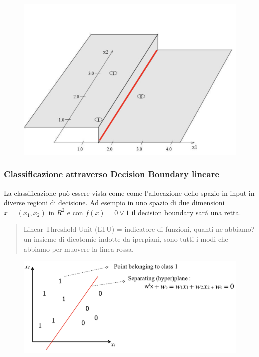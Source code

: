 \documentclass{article}
\begin{document}
\begin{figure}[H]
\centering
\includegraphics[scale=0.5]{Images/classificationplane.png}
\end{figure}

\subsubsection{Classificazione attraverso Decision Boundary lineare}
La classificazione può essere vista come come l'allocazione dello spazio in input in diverse regioni di decisione. Ad esempio in uno spazio di due dimensioni $x=(x_1,x_2)$ in $R^2$ e con $f(x) = 0 \lor 1$ il decision boundary sará una retta. 
\begin{quote}
    Linear Threshold Unit (LTU) = indicatore di funzioni, quanti ne abbiamo? un insieme di dicotomie indotte da iperpiani, sono tutti i modi che abbiamo per muovere la linea rossa.
\end{quote}
\begin{figure}[H]
\centering
\includegraphics[scale=0.5]{Images/lineardecisionboundary.png}
\end{figure}
\end{document}
